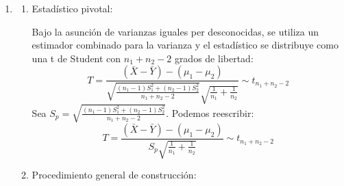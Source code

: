 \begin{enumerate}[label=\color{red}\textbf{\arabic*)}]
\begin{enumerate}[label=\color{red}\textbf{\alph*)}]
\begin{enumerate}[label=\arabic*)]
			                  Multiplicamos por el denominador: \[
				                  \mathbb{P}\left[ -z_{1-\alpha / 2}\sqrt{ \dfrac{\sigma_1^2}{n_1}+\dfrac{\sigma_2^2}{n_2} } \le (\bar{X}-\bar{Y})-(\mu_1-\mu_2)\le z_{1-\alpha / 2} \sqrt{ \dfrac{\sigma_1^2}{n}+\dfrac{\sigma_2^2}{n_2} }  \right] =1-\alpha
			                  \]
			                  Multiplicamos por $-1$ e invertimos las desigualdades, sumando $(\bar{X}-\bar{Y})$ a todos los términos: \[
				                  \mathbb{P}\left[ (\bar{X}-\bar{Y})-z_{1-\alpha / 2}\sqrt{ \dfrac{\sigma_1^2}{n_1}+\dfrac{\sigma_2^2}{n_2} }\le \mu_1-\mu_2\le (\bar{X}-\bar{Y})+z_{1-\alpha / 2}\sqrt{ \dfrac{\sigma_1^2}{n_1}+\dfrac{\sigma_2^2}{n_2} } \right] =1-\alpha
			                  \]
			            \item Intervalo de confianza final: \[
				                  IC_{1-\alpha}(\mu_1-\mu_2)=\left( (\bar{X}-\bar{Y})-z_{1-\alpha / 2}\sqrt{ \dfrac{\sigma_1^2}{n_1}+\dfrac{\sigma_2^2}{n_2} }, (\bar{X}-\bar{Y})+z_{1-\alpha / 2}\sqrt{ \dfrac{\sigma_1^2}{n_1}+\dfrac{\sigma_2^2}{n_2} } \right)
			                  \]
		            \end{enumerate}
		      \item {}
		            \begin{enumerate}[label=\arabic*)]
			            \item Estadístico pivotal:

			                  Bajo la asunción de varianzas iguales per desconocidas, se utiliza un estimador combinado para la varianza y el estadístico se distribuye como una t de Student con $n_1+n_2-2$ grados de libertad: \[
				                  T=\dfrac{(\bar{X}-\bar{Y})-(\mu_1-\mu_2)}{\sqrt{\frac{(n_1-1)S_1^2+(n_2-1)S_2^2}{n_1+n_2-2} }\sqrt{\frac{1}{n_1}+\frac{1}{n_2}}}\sim t_{n_1+n_2-2}
			                  \]
			                  Sea $S_p=\sqrt{\frac{(n_1-1)S_1^2+(n_2-1)S_2^2}{n_1+n_2-2} }$. Podemos reescribir: \[
				                  T=\dfrac{(\bar{X}-\bar{Y})-(\mu_1-\mu_2)}{S_p\sqrt{\frac{1}{n_1} +\frac{1}{n_2} } }\sim t_{n_1+n_2-2}
			                  \]
			            \item Procedimiento general de construcción:


\end{enumerate}
\end{enumerate}
\end{enumerate}
